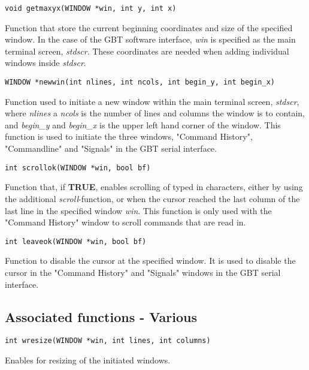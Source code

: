 \documentclass[main.tex]{subfiles}
\begin{document}
\begin{lstlisting}[frame=single] 
void getmaxyx(WINDOW *win, int y, int x)
\end{lstlisting}
Function that store the current beginning coordinates and size of the specified window. In the case of the GBT software interface, \textit{win} is specified as the main terminal screen, \textit{stdscr}. These coordinates are needed when adding individual windows inside \textit{stdscr}. \\

\begin{lstlisting}[frame=single] 
WINDOW *newwin(int nlines, int ncols, int begin_y, int begin_x)
\end{lstlisting}
Function used to initiate a new window within the main terminal screen, \textit{stdscr}, where \textit{nlines} a \textit{ncols} is the number of lines and columns the window is to contain, and \textit{begin\_y} and \textit{begin\_x} is the upper left hand corner of the window. This function is used to initiate the three windows, "Command History", "Commandline" and "Signals" in the GBT serial interface.\\

\begin{lstlisting}[frame=single] 
int scrollok(WINDOW *win, bool bf)
\end{lstlisting}
Function that, if \textbf{TRUE}, enables scrolling of typed in characters, either by using the additional \textit{scroll}-function, or when the cursor reached the last column of the last line in the specified window \textit{win}. This function is only used with the "Command History" window to scroll commands that are read in.\\

\begin{lstlisting}[frame=single] 
int leaveok(WINDOW *win, bool bf)
\end{lstlisting}
Function to disable the cursor at the specified window. It is used to disable the cursor in the "Command History" and "Signals" windows in the GBT serial interface.  

\subsection{Associated functions - Various}

\begin{lstlisting}[frame=single] 
int wresize(WINDOW *win, int lines, int columns)
\end{lstlisting}
Enables for resizing of the initiated windows. \\
\end{document}
